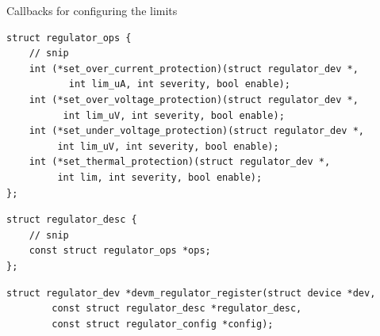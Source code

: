 \documentclass[10pt]{beamer}
\begin{document}
\begin{frame}[fragile]{Callbacks for configuring the limits}


\lstset{language=C}
\scriptsize
\begin{lstlisting}
struct regulator_ops {
	// snip
	int (*set_over_current_protection)(struct regulator_dev *,
	       int lim_uA, int severity, bool enable);
	int (*set_over_voltage_protection)(struct regulator_dev *,
	      int lim_uV, int severity, bool enable);
	int (*set_under_voltage_protection)(struct regulator_dev *,
	     int lim_uV, int severity, bool enable);
	int (*set_thermal_protection)(struct regulator_dev *,
	     int lim, int severity, bool enable);
};
\end{lstlisting}
\pause

\begin{lstlisting}
struct regulator_desc {
	// snip
	const struct regulator_ops *ops;
};
 \end{lstlisting}
\pause

\begin{lstlisting}
struct regulator_dev *devm_regulator_register(struct device *dev,
		const struct regulator_desc *regulator_desc,
		const struct regulator_config *config);
\end{lstlisting}
\end{frame}

\end{document}
